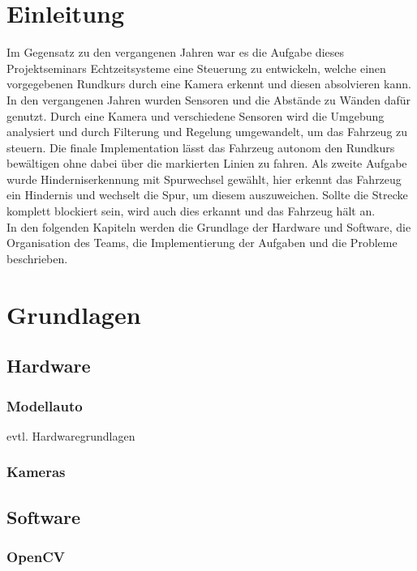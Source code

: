 \section{Einleitung}
\label{cha:einleitung}
Im Gegensatz zu den vergangenen Jahren war es die Aufgabe dieses Projektseminars Echtzeitsysteme eine Steuerung zu entwickeln, welche einen vorgegebenen Rundkurs durch eine Kamera erkennt und diesen absolvieren kann. In den vergangenen Jahren wurden Sensoren und die Abstände zu Wänden dafür genutzt. Durch eine Kamera und verschiedene Sensoren wird die Umgebung analysiert und durch Filterung und Regelung umgewandelt, um das Fahrzeug zu steuern. 
Die finale Implementation lässt das Fahrzeug autonom den Rundkurs bewältigen ohne dabei über die markierten Linien zu fahren. Als zweite Aufgabe wurde Hinderniserkennung mit Spurwechsel gewählt, hier erkennt das Fahrzeug ein Hindernis und wechselt die Spur, um diesem auszuweichen. Sollte die Strecke komplett blockiert sein, wird auch dies erkannt und das Fahrzeug hält an. \\
In den folgenden Kapiteln werden die Grundlage der Hardware und Software, die Organisation des Teams, die Implementierung der Aufgaben und die Probleme beschrieben.

\clearpage
\section{Grundlagen}
\label{cha:grundlagen}
\subsection{Hardware}
\label{sec:hardware}
\subsubsection{Modellauto}
\label{sec:modellauto}
evtl. Hardwaregrundlagen
\subsubsection{Kameras}
\label{sec:kameras}
\subsection{Software}
\label{sec:software}
\subsubsection{OpenCV}
\label{sec:openCV}
